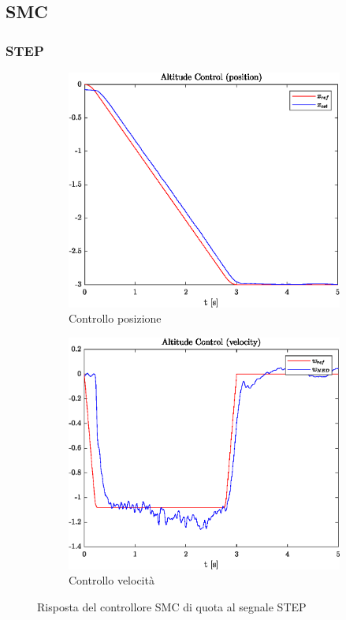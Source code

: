 \clearpage
\subsection{SMC}
\subsubsection{STEP}
\begin{figure}
	\centering
	\begin{subfigure}{0.45\textwidth}
		\centering
		\includegraphics[width=1\textwidth]{Simulazioni/Figure/SMC/STEP/AltitudeControlPos}
		\caption{Controllo posizione}
	\end{subfigure}
	\hfill
	\begin{subfigure}{0.45\textwidth}
		\centering
		\includegraphics[width=1\textwidth]{Simulazioni/Figure/SMC/STEP/AltitudeControlVel}
		\caption{Controllo velocità}
	\end{subfigure}
	\caption{Risposta del controllore SMC di quota al segnale STEP}	
\end{figure}

